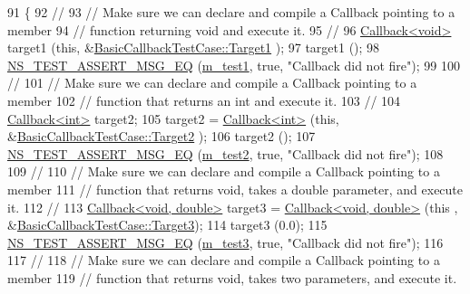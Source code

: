 \begin{DoxyCode}
91 \{
92   \textcolor{comment}{//}
93   \textcolor{comment}{// Make sure we can declare and compile a Callback pointing to a member }
94   \textcolor{comment}{// function returning void and execute it.}
95   \textcolor{comment}{//}
96   \hyperlink{classns3_1_1Callback}{Callback<void>} target1 (\textcolor{keyword}{this}, &\hyperlink{classBasicCallbackTestCase_a355bda47bacdd87c9db8f521ef11c2f8}{BasicCallbackTestCase::Target1}
      );
97   target1 ();
98   \hyperlink{group__testing_ga2a9d78cffb3db8e867c35fff0b698cf5}{NS\_TEST\_ASSERT\_MSG\_EQ} (\hyperlink{classBasicCallbackTestCase_a484e0387aef71de764840664484d03b6}{m\_test1}, \textcolor{keyword}{true}, \textcolor{stringliteral}{"Callback did not fire"});
99 
100   \textcolor{comment}{//}
101   \textcolor{comment}{// Make sure we can declare and compile a Callback pointing to a member }
102   \textcolor{comment}{// function that returns an int and execute it.}
103   \textcolor{comment}{//}
104   \hyperlink{classns3_1_1Callback}{Callback<int>} target2;
105   target2 = \hyperlink{classns3_1_1Callback}{Callback<int>} (\textcolor{keyword}{this}, &\hyperlink{classBasicCallbackTestCase_a9bbbcd0919566d5882de93051b82f4b0}{BasicCallbackTestCase::Target2}
      );
106   target2 ();
107   \hyperlink{group__testing_ga2a9d78cffb3db8e867c35fff0b698cf5}{NS\_TEST\_ASSERT\_MSG\_EQ} (\hyperlink{classBasicCallbackTestCase_a0706e802f271c7335748328522d38285}{m\_test2}, \textcolor{keyword}{true}, \textcolor{stringliteral}{"Callback did not fire"});
108 
109   \textcolor{comment}{//}
110   \textcolor{comment}{// Make sure we can declare and compile a Callback pointing to a member }
111   \textcolor{comment}{// function that returns void, takes a double parameter, and execute it.}
112   \textcolor{comment}{//}
113   \hyperlink{classns3_1_1Callback}{Callback<void, double>} target3 = \hyperlink{classns3_1_1Callback}{Callback<void, double>} (\textcolor{keyword}{this}
      , &\hyperlink{classBasicCallbackTestCase_a6316385907068e5282825059758ac973}{BasicCallbackTestCase::Target3});
114   target3 (0.0);
115   \hyperlink{group__testing_ga2a9d78cffb3db8e867c35fff0b698cf5}{NS\_TEST\_ASSERT\_MSG\_EQ} (\hyperlink{classBasicCallbackTestCase_a268a26f2e31bf54bc67de38d127fa327}{m\_test3}, \textcolor{keyword}{true}, \textcolor{stringliteral}{"Callback did not fire"});
116 
117   \textcolor{comment}{//}
118   \textcolor{comment}{// Make sure we can declare and compile a Callback pointing to a member }
119   \textcolor{comment}{// function that returns void, takes two parameters, and execute it.}

\end{DoxyCode}
